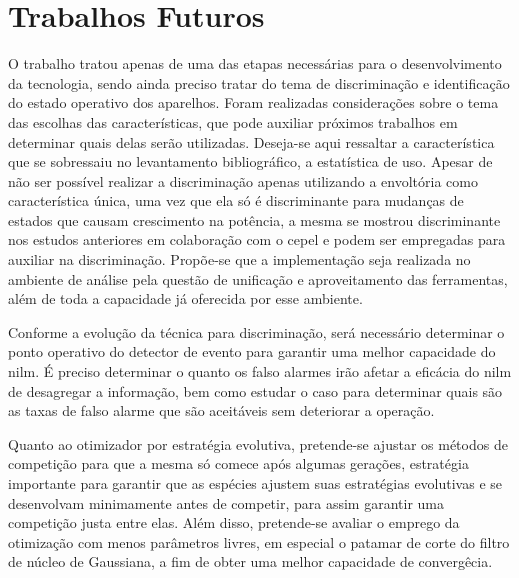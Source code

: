 \section{Trabalhos Futuros}
\label{sec:trabfut}

O trabalho tratou apenas de uma das etapas necessárias para o
desenvolvimento da tecnologia, sendo ainda preciso tratar do tema de
discriminação e identificação do estado operativo dos aparelhos.
Foram realizadas considerações sobre o tema das escolhas das
características, que pode auxiliar próximos trabalhos em determinar
quais delas serão utilizadas. Deseja-se aqui ressaltar a
característica que se sobressaiu no levantamento bibliográfico, a
estatística de uso. Apesar de não ser possível realizar a discriminação
apenas utilizando a envoltória como característica única, uma vez que
ela só é discriminante para mudanças de estados que causam crescimento
na potência, a mesma se mostrou discriminante nos estudos anteriores
em colaboração com o \acs{cepel} e podem ser empregadas para auxiliar
na discriminação.  Propõe-se que a implementação seja realizada no
ambiente de análise pela questão de unificação e aproveitamento das
ferramentas, além de toda a capacidade já oferecida por esse ambiente.

Conforme a evolução da técnica para discriminação, será necessário
determinar o ponto operativo do detector de evento para garantir uma
melhor capacidade do \acs{nilm}. É preciso determinar o quanto os
falso alarmes irão afetar a eficácia do \acs{nilm} de desagregar a
informação, bem como estudar o caso para determinar quais são
as taxas de falso alarme que são aceitáveis sem deteriorar a operação.

Quanto ao otimizador por estratégia evolutiva, pretende-se ajustar os
métodos de competição para que a mesma só comece após algumas
gerações, estratégia importante para garantir que as espécies ajustem
suas estratégias evolutivas e se desenvolvam minimamente antes de
competir, para assim garantir uma competição justa entre elas. Além
disso, pretende-se avaliar o emprego da otimização com menos
parâmetros livres, em especial o patamar de corte do filtro de núcleo
de Gaussiana, a fim de obter uma melhor capacidade de convergêcia.
